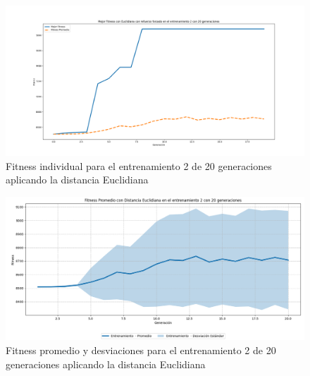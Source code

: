 \documentclass[conference]{IEEEtran}
\begin{document}
\begin{figure}[H]
    \centering
    \includegraphics[width=0.9 \linewidth]{Euclidiana/Fitness_individual_20/Fitness_2_Eucli_20Gen.png}
    \caption{Fitness individual para el entrenamiento 2 de 20 generaciones aplicando la distancia Euclidiana}
    \label{fig:eucli_2_20}
\end{figure}
\begin{figure}[H]
    \centering
    \includegraphics[width=0.9 \linewidth]{Euclidiana/Fitness_individual_20/Fitness_2_Eucli_20Gen_Sombra.png}
    \caption{Fitness promedio y desviaciones para el entrenamiento 2 de 20 generaciones aplicando la distancia Euclidiana}
    \label{fig:eucli_2_20_sombra}
\end{figure}
\end{document}
